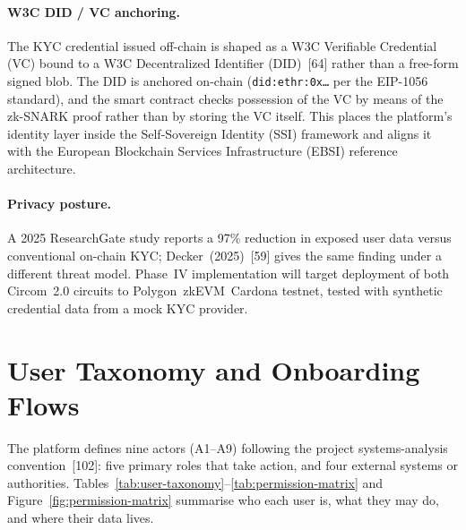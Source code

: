 \documentclass[12pt, a4paper]{report}
\begin{document}
\paragraph{W3C DID / VC anchoring.}
The KYC credential issued off-chain is shaped as a W3C Verifiable Credential (VC) bound to a W3C Decentralized Identifier (DID)~[64] rather than a free-form signed blob. The DID is anchored on-chain (\texttt{did:ethr:0x\ldots} per the EIP-1056 standard), and the smart contract checks possession of the VC by means of the zk-SNARK proof rather than by storing the VC itself. This places the platform's identity layer inside the Self-Sovereign Identity (SSI) framework and aligns it with the European Blockchain Services Infrastructure (EBSI) reference architecture.

\paragraph{Privacy posture.}
A 2025 ResearchGate study reports a 97\% reduction in exposed user data versus conventional on-chain KYC; Decker~(2025)~[59] gives the same finding under a different threat model. Phase~IV implementation will target deployment of both Circom~2.0 circuits to Polygon~zkEVM~Cardona testnet, tested with synthetic credential data from a mock KYC provider.

\section{User Taxonomy and Onboarding Flows}
\label{sec:onboarding}

The platform defines nine actors (A1--A9) following the project systems-analysis convention~[102]: five primary roles that take action, and four external systems or authorities. Tables~\ref{tab:user-taxonomy}--\ref{tab:permission-matrix} and Figure~\ref{fig:permission-matrix} summarise who each user is, what they may do, and where their data lives.
\end{document}
